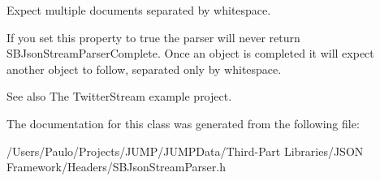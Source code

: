 Expect multiple documents separated by whitespace. 

If you set this property to true the parser will never return SBJsonStreamParserComplete. Once an object is completed it will expect another object to follow, separated only by whitespace.

\begin{DoxySeeAlso}{See also}
The TwitterStream example project. 
\end{DoxySeeAlso}


The documentation for this class was generated from the following file:\begin{DoxyCompactItemize}
\item 
/Users/Paulo/Projects/JUMP/JUMPData/Third-\/Part Libraries/JSON Framework/Headers/SBJsonStreamParser.h\end{DoxyCompactItemize}
